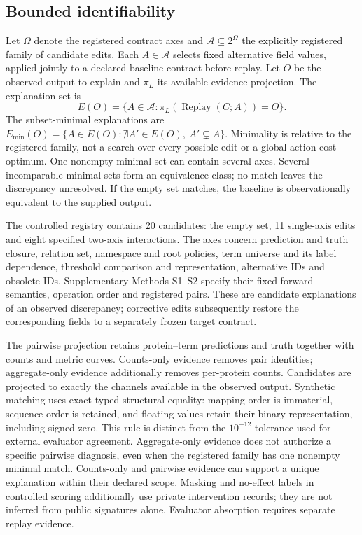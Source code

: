 \documentclass[11pt]{article}
\begin{document}
\subsection{Bounded identifiability}
Let $\Omega$ denote the registered contract axes and $\mathcal{A}\subseteq 2^\Omega$ the explicitly registered family of candidate edits. Each $A\in\mathcal{A}$ selects fixed alternative field values, applied jointly to a declared baseline contract before replay. Let $O$ be the observed output to explain and $\pi_L$ its available evidence projection. The explanation set is
\[
  E(O)=\{A\in\mathcal{A}: \pi_L(\operatorname{Replay}(C;A))=O\}.
\]
The subset-minimal explanations are $E_{\min}(O)=\{A\in E(O):\nexists A'\in E(O),\ A'\subsetneq A\}$. Minimality is relative to the registered family, not a search over every possible edit or a global action-cost optimum. One nonempty minimal set can contain several axes. Several incomparable minimal sets form an equivalence class; no match leaves the discrepancy unresolved. If the empty set matches, the baseline is observationally equivalent to the supplied output.

The controlled registry contains 20 candidates: the empty set, 11 single-axis edits and eight specified two-axis interactions. The axes concern prediction and truth closure, relation set, namespace and root policies, term universe and its label dependence, threshold comparison and representation, alternative IDs and obsolete IDs. Supplementary Methods S1--S2 specify their fixed forward semantics, operation order and registered pairs. These are candidate explanations of an observed discrepancy; corrective edits subsequently restore the corresponding fields to a separately frozen target contract.

The pairwise projection retains protein--term predictions and truth together with counts and metric curves. Counts-only evidence removes pair identities; aggregate-only evidence additionally removes per-protein counts. Candidates are projected to exactly the channels available in the observed output. Synthetic matching uses exact typed structural equality: mapping order is immaterial, sequence order is retained, and floating values retain their binary representation, including signed zero. This rule is distinct from the $10^{-12}$ tolerance used for external evaluator agreement. Aggregate-only evidence does not authorize a specific pairwise diagnosis, even when the registered family has one nonempty minimal match. Counts-only and pairwise evidence can support a unique explanation within their declared scope. Masking and no-effect labels in controlled scoring additionally use private intervention records; they are not inferred from public signatures alone. Evaluator absorption requires separate replay evidence.
\end{document}
